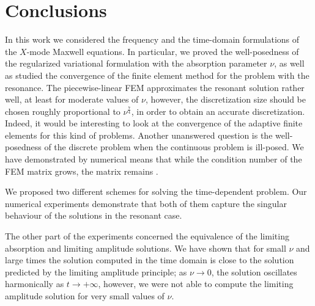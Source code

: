 \section{Conclusions}
In this work we considered the frequency  and the time-domain formulations of the $X$-mode Maxwell equations. 
In particular, we proved the well-posedness of the regularized variational formulation with
the absorption parameter $\nu$, as 
well as studied the convergence of the finite element method for the problem with the resonance. 
The piecewise-linear FEM approximates the resonant solution rather well, at least for moderate values of $\nu$, 
however, the discretization size should be chosen roughly proportional to $\nu^{\frac{7}{4}}$, in order to obtain an accurate discretization.
Indeed, it would be interesting to look at the convergence of the adaptive finite elements for this kind of problems. 
Another unanswered question is the well-posedness of the discrete problem when the continuous problem is ill-posed. We have 
demonstrated by numerical means that while the condition number of the FEM matrix grows, the matrix remains . 

We proposed two different schemes for solving the time-dependent problem. 
Our numerical experiments demonstrate that both of them capture the singular behaviour of the solutions in the resonant case.

The other part of the experiments concerned the equivalence of the limiting absorption and limiting amplitude solutions. We have shown 
that for small $\nu$ and large times the solution computed in the time domain is close to the solution predicted by the limiting amplitude principle; as 
$\nu\rightarrow 0$, the solution oscillates harmonically as $t\rightarrow +\infty$, however, we were not able to compute the limiting amplitude solution for very 
small values of $\nu$. 